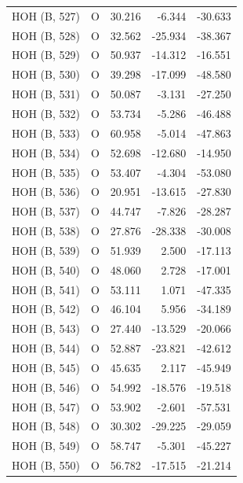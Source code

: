 \begin{longtable}{@{}lcrr@{}}
  \cmidrule(r){1-5}
  HOH (B, 527) & O & 30.216 & -6.344 & -30.633 \\
  \cmidrule(r){1-5}
  HOH (B, 528) & O & 32.562 & -25.934 & -38.367 \\
  \cmidrule(r){1-5}
  HOH (B, 529) & O & 50.937 & -14.312 & -16.551 \\
  \cmidrule(r){1-5}
  HOH (B, 530) & O & 39.298 & -17.099 & -48.580 \\
  \cmidrule(r){1-5}
  HOH (B, 531) & O & 50.087 & -3.131 & -27.250 \\
  \cmidrule(r){1-5}
  HOH (B, 532) & O & 53.734 & -5.286 & -46.488 \\
  \cmidrule(r){1-5}
  HOH (B, 533) & O & 60.958 & -5.014 & -47.863 \\
  \cmidrule(r){1-5}
  HOH (B, 534) & O & 52.698 & -12.680 & -14.950 \\
  \cmidrule(r){1-5}
  HOH (B, 535) & O & 53.407 & -4.304 & -53.080 \\
  \cmidrule(r){1-5}
  HOH (B, 536) & O & 20.951 & -13.615 & -27.830 \\
  \cmidrule(r){1-5}
  HOH (B, 537) & O & 44.747 & -7.826 & -28.287 \\
  \cmidrule(r){1-5}
  HOH (B, 538) & O & 27.876 & -28.338 & -30.008 \\
  \cmidrule(r){1-5}
  HOH (B, 539) & O & 51.939 & 2.500 & -17.113 \\
  \cmidrule(r){1-5}
  HOH (B, 540) & O & 48.060 & 2.728 & -17.001 \\
  \cmidrule(r){1-5}
  HOH (B, 541) & O & 53.111 & 1.071 & -47.335 \\
  \cmidrule(r){1-5}
  HOH (B, 542) & O & 46.104 & 5.956 & -34.189 \\
  \cmidrule(r){1-5}
  HOH (B, 543) & O & 27.440 & -13.529 & -20.066 \\
  \cmidrule(r){1-5}
  HOH (B, 544) & O & 52.887 & -23.821 & -42.612 \\
  \cmidrule(r){1-5}
  HOH (B, 545) & O & 45.635 & 2.117 & -45.949 \\
  \cmidrule(r){1-5}
  HOH (B, 546) & O & 54.992 & -18.576 & -19.518 \\
  \cmidrule(r){1-5}
  HOH (B, 547) & O & 53.902 & -2.601 & -57.531 \\
  \cmidrule(r){1-5}
  HOH (B, 548) & O & 30.302 & -29.225 & -29.059 \\
  \cmidrule(r){1-5}
  HOH (B, 549) & O & 58.747 & -5.301 & -45.227 \\
  \cmidrule(r){1-5}
  HOH (B, 550) & O & 56.782 & -17.515 & -21.214 \\

\end{longtable}

